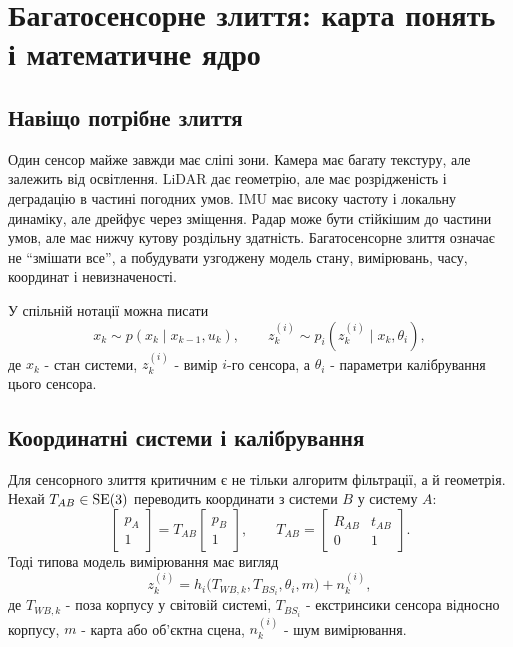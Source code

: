 \chapter{Багатосенсорне злиття: карта понять і математичне ядро}
\label{ch:multisensor-fusion}


\section{Навіщо потрібне злиття}

Один сенсор майже завжди має сліпі зони. Камера має багату текстуру, але залежить від освітлення. LiDAR дає геометрію, але має розрідженість і деградацію в частині погодних умов. IMU має високу частоту і локальну динаміку, але дрейфує через зміщення. Радар може бути стійкішим до частини умов, але має нижчу кутову роздільну здатність. Багатосенсорне злиття означає не ``змішати все'', а побудувати узгоджену модель стану, вимірювань, часу, координат і невизначеності.

У спільній нотації можна писати
\begin{equation}
  x_k \sim p(x_k\mid x_{k-1},u_k), \qquad
  z^{(i)}_k \sim p_i(z^{(i)}_k \mid x_k,\theta_i),
\end{equation}
де $x_k$ - стан системи, $z^{(i)}_k$ - вимір $i$-го сенсора, а $\theta_i$ - параметри калібрування цього сенсора.

\section{Координатні системи і калібрування}

Для сенсорного злиття критичним є не тільки алгоритм фільтрації, а й геометрія. Нехай $T_{AB}\in\mathrm{SE}(3)$ переводить координати з системи $B$ у систему $A$:
\begin{equation}
  \begin{bmatrix}p_A\\1\end{bmatrix}
  = T_{AB}\begin{bmatrix}p_B\\1\end{bmatrix}, \qquad
  T_{AB}=\begin{bmatrix}R_{AB}&t_{AB}\\0&1\end{bmatrix}.
\end{equation}
Тоді типова модель вимірювання має вигляд
\begin{equation}
  z^{(i)}_k = h_i\bigl(T_{WB,k},T_{BS_i},\theta_i,m\bigr)+n^{(i)}_k,
\end{equation}
де $T_{WB,k}$ - поза корпусу у світовій системі, $T_{BS_i}$ - екстринсики сенсора відносно корпусу, $m$ - карта або об'єктна сцена, $n^{(i)}_k$ - шум вимірювання.


